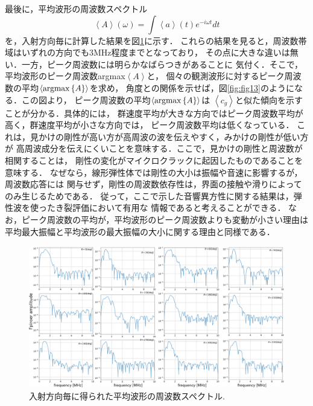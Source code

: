 最後に，平均波形の周波数スペクトル
\begin{equation}
	\left< A \right> (\omega) = \int \left<a\right>(t)e^{-i\omega t}dt
	\label{eqn:ave_A}
\end{equation}
を，入射方向毎に計算した結果を図\ref{fig:fig11_2}に示す．
これらの結果を見ると，周波数帯域はいずれの方向でも3MHz程度までとなっており，
その点に大きな違いは無い．一方，ピーク周波数には明らかなばらつきがあることに
気付く．そこで，平均波形のピーク周波数argmax$\left< A \right>$と，
個々の観測波形に対するピーク周波数の平均$\left< {\rm argmax }\left\{ A \right\}\right>$を求め，
角度との関係を示せば，図\ref{fig:fig13}のようになる．この図より，
ピーク周波数の平均$\left< {\rm argmax }\left\{ A \right\}\right>$は
$\left< c_g\right>$と似た傾向を示すことが分かる．具体的には，
群速度平均が大きな方向ではピーク周波数平均が高く，群速度平均が小さな方向では，
ピーク周波数平均は低くなっている．
これは，見かけの剛性が高い方が高周波の波を伝えやすく，みかけの剛性が低い方が
高周波成分を伝えにくいことを意味する．ここで，見かけの剛性と周波数が相関することは，
剛性の変化がマイクロクラックに起因したものであることを意味する．
なぜなら，線形弾性体では剛性の大小は振幅や音速に影響するが，周波数応答には
関与せず，剛性の周波数依存性は，界面の接触や滑りによってのみ生じるためである．
従って，ここで示した音響異方性に関する結果は，弾性波を使ったき裂評価において有用な
情報であると考えることができる．
なお，ピーク周波数の平均が，平均波形のピーク周波数よりも変動が小さい理由は
平均最大振幅と平均波形の最大振幅の大小に関する理由と同様である．
\begin{figure}[h]
	\begin{center}
	\includegraphics[width=1.0\linewidth]{Figs/fig11_2.eps} 
	\end{center}
	\caption{
		入射方向毎に得られた平均波形の周波数スペクトル.
	} 
	\label{fig:fig11_2}
\end{figure}
